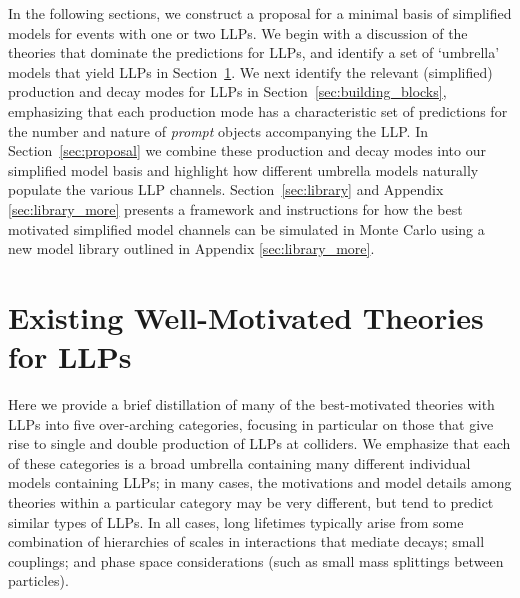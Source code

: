 In the following sections, we construct a proposal for a minimal basis of simplified models for events with one or two LLPs.
We begin with a discussion of the theories that dominate the predictions for LLPs, and identify a set of `umbrella' models that yield LLPs in Section~\ref{sec:motivated_theories}.  We next identify the relevant (simplified) production and decay modes for LLPs in Section~\ref{sec:building_blocks},  emphasizing that each production mode has a characteristic set of predictions for the number and nature of {\em prompt} objects accompanying the LLP.  In Section~\ref{sec:proposal} we combine these production and decay modes into our simplified model basis and highlight how different umbrella models naturally populate the various LLP channels.  Section~\ref{sec:library} and Appendix  \ref{sec:library_more}  presents a framework and instructions for how the best motivated simplified model channels can be simulated in Monte Carlo using a new model library outlined in Appendix \ref{sec:library_more}. 


\section{Existing Well-Motivated Theories for LLPs}\label{sec:motivated_theories}

Here we provide a brief distillation of many of the best-motivated theories with LLPs into five over-arching categories, focusing in particular on those that give rise to single and double production of LLPs at colliders.  We emphasize that each of these categories is a broad umbrella containing many different individual models containing LLPs; in many cases, the motivations and model details among theories within a particular category may be very different, but  tend to predict similar types of LLPs. In all cases, long lifetimes typically arise from some combination of hierarchies of scales in interactions that mediate decays; small couplings; and phase space considerations (such as small mass splittings between particles).

